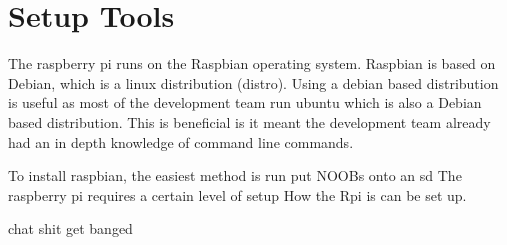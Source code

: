 \section{Setup Tools}

The raspberry pi runs on the Raspbian operating system. Raspbian is based on Debian, which is a linux distribution (distro). Using a debian based distribution is useful as most of the development team run ubuntu which is also a Debian based distribution. This is beneficial is it meant the development team already had an in depth knowledge of command line commands.

To install raspbian, the easiest method is run put NOOBs onto an sd 
The raspberry pi requires a certain level of setup
How the Rpi is can be set up.

chat shit get banged 